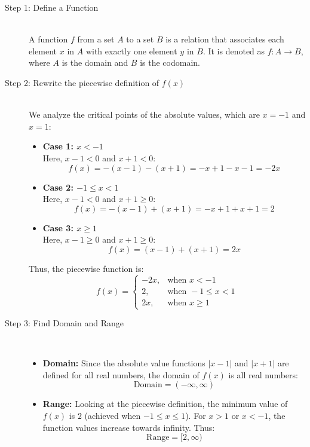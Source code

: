 \documentclass[11pt, a4paper]{article}
\begin{document}
\begin{description}
    \item[Step 1: Define a Function] \ \\
    A function $f$ from a set $A$ to a set $B$ is a relation that associates each element $x$ in $A$ with exactly one element $y$ in $B$. It is denoted as $f: A \to B$, where $A$ is the domain and $B$ is the codomain.

    \item[Step 2: Rewrite the piecewise definition of $f(x)$] \ \\
    We analyze the critical points of the absolute values, which are $x = -1$ and $x = 1$:
    \begin{itemize}
        \item \textbf{Case 1: $x < -1$} \\
        Here, $x - 1 < 0$ and $x + 1 < 0$:
        \[ f(x) = -(x - 1) - (x + 1) = -x + 1 - x - 1 = -2x \]
        
        \item \textbf{Case 2: $-1 \le x < 1$} \\
        Here, $x - 1 < 0$ and $x + 1 \ge 0$:
        \[ f(x) = -(x - 1) + (x + 1) = -x + 1 + x + 1 = 2 \]
        
        \item \textbf{Case 3: $x \ge 1$} \\
        Here, $x - 1 \ge 0$ and $x + 1 \ge 0$:
        \[ f(x) = (x - 1) + (x + 1) = 2x \]
    \end{itemize}
    Thus, the piecewise function is:
    \[ 
    f(x) = \begin{cases} 
    -2x, & \text{when } x < -1 \\ 
    2, & \text{when } -1 \le x < 1 \\ 
    2x, & \text{when } x \ge 1 
    \end{cases} 
    \]

    \item[Step 3: Find Domain and Range] \ 
    \begin{itemize}
        \item \textbf{Domain:} Since the absolute value functions $|x-1|$ and $|x+1|$ are defined for all real numbers, the domain of $f(x)$ is all real numbers:
        \[ \text{Domain} = (-\infty, \infty) \]
        \item \textbf{Range:} Looking at the piecewise definition, the minimum value of $f(x)$ is $2$ (achieved when $-1 \le x \le 1$). For $x > 1$ or $x < -1$, the function values increase towards infinity. Thus:
        \[ \text{Range} = [2, \infty) \]
    \end{itemize}


\end{description}
\end{document}
